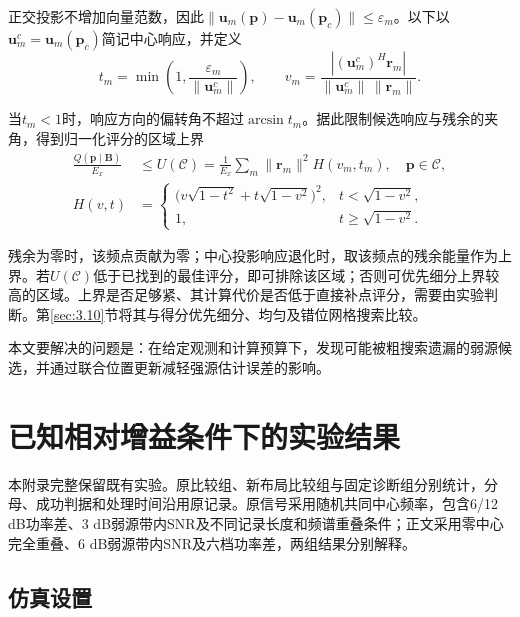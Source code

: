 \documentclass[11pt,a4paper]{article}
\numberwithin{equation}{section}
\numberwithin{figure}{section}
\numberwithin{table}{section}
\begin{document}
正交投影不增加向量范数，因此$\|\mathbf u_m(\mathbf p)-\mathbf u_m(\mathbf p_c)\|\leq\varepsilon_m$。以下以$\mathbf u_m^c=\mathbf u_m(\mathbf p_c)$简记中心响应，并定义
\begin{equation}\label{eq:cone-parameters}
t_m=\min\!\left(1,\frac{\varepsilon_m}{\|\mathbf u_m^c\|}\right),\qquad
v_m=\frac{|(\mathbf u_m^c)^H\mathbf r_m|}{\|\mathbf u_m^c\|\,\|\mathbf r_m\|}.
\end{equation}

当$t_m<1$时，响应方向的偏转角不超过$\arcsin t_m$。据此限制候选响应与残余的夹角，得到归一化评分的区域上界
\begin{equation}\label{eq:cell-upper}
\begin{aligned}
\frac{Q(\mathbf p\mid\mathbf B)}{E_x}&\leq U(\mathcal C)
=\frac{1}{E_x}\sum_m\|\mathbf r_m\|^2 H(v_m,t_m),\quad \mathbf p\in\mathcal C,\\
H(v,t)&=\begin{cases}
\bigl(v\sqrt{1-t^2}+t\sqrt{1-v^2}\bigr)^2,&t<\sqrt{1-v^2},\\
1,&t\geq\sqrt{1-v^2}.
\end{cases}
\end{aligned}
\end{equation}

残余为零时，该频点贡献为零；中心投影响应退化时，取该频点的残余能量作为上界。若$U(\mathcal C)$低于已找到的最佳评分，即可排除该区域；否则可优先细分上界较高的区域。上界是否足够紧、其计算代价是否低于直接补点评分，需要由实验判断。第\ref{sec:3.10}节将其与得分优先细分、均匀及错位网格搜索比较。

本文要解决的问题是：在给定观测和计算预算下，发现可能被粗搜索遗漏的弱源候选，并通过联合位置更新减轻强源估计误差的影响。

\section{已知相对增益条件下的实验结果}\label{sec:3}

本附录完整保留既有实验。原比较组、新布局比较组与固定诊断组分别统计，分母、成功判据和处理时间沿用原记录。原信号采用随机共同中心频率，包含6/12 dB功率差、3 dB弱源带内SNR及不同记录长度和频谱重叠条件；正文采用零中心完全重叠、6 dB弱源带内SNR及六档功率差，两组结果分别解释。

\subsection{仿真设置}\label{sec:3.1}
\end{document}
